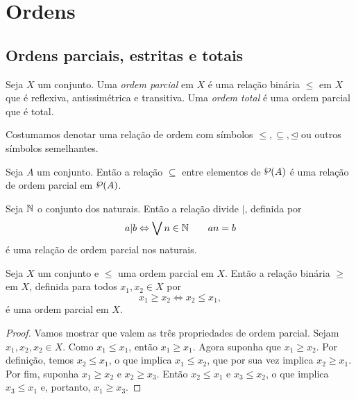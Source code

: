 \section{Ordens}

\subsection{Ordens parciais, estritas e totais}

\begin{definition}
	Seja $X$ um conjunto. Uma \emph{ordem parcial} em $X$ é uma relação binária $\leq$ em $X$ que é reflexiva, antissimétrica e transitiva. Uma \emph{ordem total} é uma ordem parcial que é total.
\end{definition}

	Costumamos denotar uma relação de ordem com símbolos $\leq, \subseteq, \unlhd$ ou outros símbolos semelhantes.
	
\begin{example}
	Seja $A$ um conjunto. Então a relação $\subseteq$ entre elementos de $\p(A)$ é uma relação de ordem parcial em $\p(A)$.
\end{example}

\begin{example}
	Seja $\mathbb{N}$ o conjunto dos naturais. Então a relação divide $|$, definida por
	\begin{equation*}
	a|b \Leftrightarrow \bigvee\nolimits n \in \mathbb{N} \qquad an=b
	\end{equation*}
é uma relação de ordem parcial nos naturais.
\end{example}

\begin{proposition}
	Seja $X$ um conjunto e $\leq$ uma ordem parcial em $X$. Então a relação binária $\geq$ em $X$, definida para todos $x_1,x_2 \in X$ por
	\begin{equation*}
	x_1 \geq x_2 \Leftrightarrow x_2 \leq x_1,
	\end{equation*}
é uma ordem parcial em $X$.
\end{proposition}
\begin{proof}
	Vamos mostrar que valem as três propriedades de ordem parcial. Sejam $x_1,x_2,x_2 \in X$. Como $x_1 \leq x_1$, então $x_1 \geq x_1$. Agora suponha que $x_1 \geq x_2$. Por definição, temos $x_2 \leq x_1$, o que implica $x_1 \leq x_2$, que por sua vez implica $x_2 \geq x_1$. Por fim, suponha $x_1 \geq x_2$ e $x_2 \geq x_3$. Então $x_2 \leq x_1$ e $x_3 \leq x_2$, o que implica $x_3 \leq x_1$ e, portanto, $x_1 \geq x_3$.
\end{proof}

